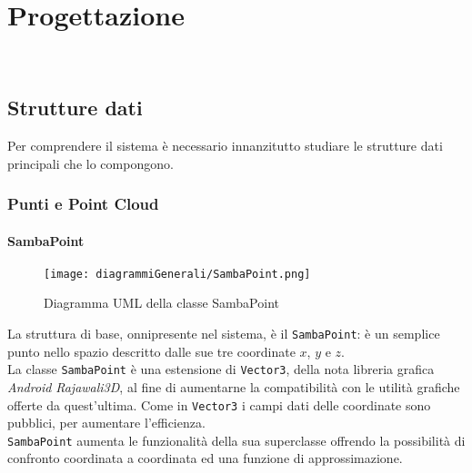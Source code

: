 
\chapter{Progettazione}
\label{cap:progettazione-codifica}

\\


\section{Strutture dati}
Per comprendere il sistema è necessario innanzitutto studiare le strutture dati principali che lo compongono.\\

\subsection{Punti e Point Cloud}

\subsubsection{SambaPoint}
\begin{figure}[H] 
    \centering 
    \texttt{[image: diagrammiGenerali/SambaPoint.png]} 
    \caption{Diagramma UML della classe SambaPoint}
\end{figure}
La struttura di base, onnipresente nel sistema, è il \texttt{SambaPoint}: è un semplice punto nello spazio descritto dalle sue tre coordinate $x$, $y$ e $z$.\\
La classe \texttt{SambaPoint} è una estensione di \texttt{Vector3}, della nota libreria grafica \emph{Android} \emph{Rajawali3D}, al fine di aumentarne la compatibilità con le utilità grafiche offerte da quest'ultima. Come in \texttt{Vector3} i campi dati delle coordinate sono pubblici, per aumentare l'efficienza.\\
\texttt{SambaPoint} aumenta le funzionalità della sua superclasse offrendo la possibilità di confronto coordinata a coordinata ed una funzione di approssimazione. 

